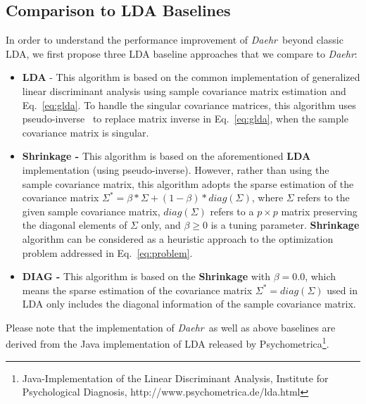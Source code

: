 \documentclass[journal,compsoc]{IEEEtran}
\newcommand{\TheName}{\mbox{\emph{Daehr}}}
\begin{document}
\subsection{Comparison to LDA Baselines}\label{sec:baselines}
In order to understand the performance improvement of \TheName\ beyond classic LDA, we first propose three LDA baseline approaches that we compare to \TheName:
\begin{itemize}
\item \textbf{LDA} - This algorithm is based on the common implementation of generalized linear discriminant analysis using sample covariance matrix estimation and Eq.~\ref{eq:glda}. To handle the singular covariance matrices, this algorithm uses pseudo-inverse~\cite{ye2004optimization} to replace matrix inverse in Eq.~\ref{eq:glda}, when the sample covariance matrix is singular.

\item \textbf{Shrinkage - } This algorithm is based on the aforementioned \textbf{LDA} implementation (using pseudo-inverse). However, rather than using the sample covariance matrix, this algorithm adopts the sparse estimation of the covariance matrix $\Sigma^*=\beta*\Sigma+(1-\beta) * diag(\Sigma)$, where $\Sigma$ refers to the given sample covariance matrix, $diag(\Sigma)$ refers to a $p\times p$ matrix preserving the diagonal elements of $\Sigma$ only, and $\beta\geq 0$ is a tuning parameter. \textbf{Shrinkage} algorithm can be considered as a heuristic approach to the optimization problem addressed in Eq.~\ref{eq:problem}.

\item \textbf{DIAG - } This algorithm is based on the \textbf{Shrinkage} with $\beta=0.0$, which means the sparse estimation of the covariance matrix $\Sigma^*=diag(\Sigma)$ used in LDA only includes the diagonal information of the sample covariance matrix.

\end{itemize}
Please note that the implementation of \TheName\ as well as above baselines are derived from the Java implementation of LDA released by Psychometrica\footnote{Java-Implementation of the Linear Discriminant Analysis, Institute for Psychological Diagnosis, http://www.psychometrica.de/lda.html}.
\end{document}

